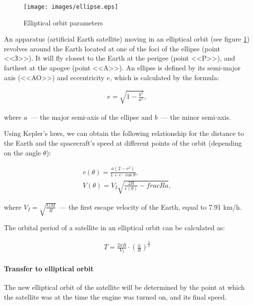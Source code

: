 \documentclass[12pt,a4paper]{article}
\begin{document}
\begin{figure}[tbh]
  \begin{center}
    \texttt{[image: images/ellipse.eps]}
    \caption{Elliptical orbit parameters}
    \label{Pic:Ellipse}
  \end{center}
\end{figure}

An apparatus (artificial Earth satellite) moving in an elliptical orbit (see figure \ref{Pic:Ellipse}) revolves around the Earth located at one of the foci of the ellipse (point <<З>>). It will fly closest to the Earth at the perigee (point <<P>>), and farthest at the apogee (point <<A>>). An ellipse is defined by its semi-major axis (<<AO>>) and eccentricity $e$, which is calculated by the formula:

\begin{eqnarray}
  e = \sqrt{1 - \frac{b^2}{a^2}},
\end{eqnarray}

where $a$~--- the major semi-axis of the ellipse and $b$~--- the minor semi-axis.

Using Kepler's laws, we can obtain the following relationship for the distance to the Earth and the spacecraft's speed at different points of the orbit (depending on the angle $\theta$):

\begin{eqnarray}
  r(\theta) = \frac{a (2 - e^2)}{1 + e \cdot \cos\theta},\\
  V(\theta) = V_I \sqrt{\frac{2 R}{r(\theta)} - frac{R}{a}},
\end{eqnarray}

where $V_I = \sqrt{\frac{G M}{R}}$~--- the first escape velocity of the Earth, equal to 7.91 km/h.

The orbital period of a satellite in an elliptical orbit can be calculated as:

\begin{eqnarray}
  T = \frac{2 \pi R}{V_I} \cdot \left( \frac{a}{R} \right)^{\frac{3}{2}}
\end{eqnarray}

\paragraph{Transfer to elliptical orbit}

The new elliptical orbit of the satellite will be determined by the point at which the satellite was at the time the engine was turned on, and its final speed.
\end{document}
